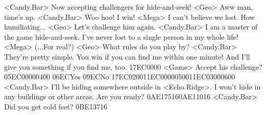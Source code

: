 <Candy.Bar> Now accepting challengers for hide-and-seek! 
<Geo> Aww man, time's up. 
<Candy.Bar> Woo hoo! I win! 
<Mega> I can't believe we lost. How humiliating... 
<Geo> Let's challenge him again. 
<Candy.Bar> I am a master of the game hide-and-seek. 
I've never lost to a single person in my whole life! 
<Mega> (...For real?) 
<Geo> What rules do you play by? 
<Candy.Bar> They're pretty simple. 
You win if you can find me within one minute! 
And I'll give you something if you find me, too. 
{17}{EC}{00}{00} 
<Game> Accept his challenge? {05}{EC}{00}{00}{04}{00}  {06}{EC}Yes   {09}{EC}No 
{17}{EC}{02}{00}{11}{EC}{00}{00}{05}{00}{11}{EC}{03}{00}{06}{00}
<Candy.Bar> I'll be hiding somewhere outside in <Echo.Ridge>. 
I won't hide in any buildings or other areas. 
Are you ready? 
{0A}{E1}{75}{16}{0A}{E1}{10}{16}
<Candy.Bar> Did you get cold feet? 
{0B}{E1}{37}{16}
